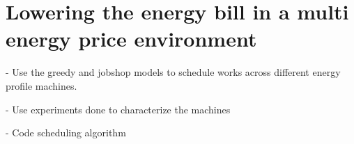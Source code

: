 \chapter{Lowering the energy bill in a multi energy price environment}


- Use the greedy and jobshop models to schedule works across different energy
  profile machines. 

- Use experiments done to characterize the machines 

- Code scheduling algorithm

